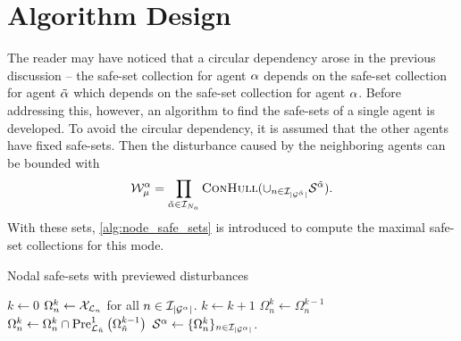 \section{Algorithm Design}
The reader may have noticed that a circular dependency arose in the previous discussion -- the safe-set collection for agent $\alpha$ depends on the safe-set collection for agent ${\tilde{\alpha}}$ which depends on the safe-set collection for agent $\alpha$. Before addressing this, however, an algorithm to find the safe-sets of a single agent is developed. To avoid the circular dependency, it is assumed that the other agents have fixed safe-sets. Then the disturbance caused by the neighboring agents can be bounded with
\begin{equation}
\wcon[\agentidx][\modeidx]=\prod_{\tilde{\agentidx}\in\idxset{\numagents}}\Call{ConHull}{\cup_{n\in\idxset{\gnumnodes[\tilde{\agentidx}]}}\mathcal{S}^{\tilde{\agentidx}}}.
\end{equation}
With these sets, \autoref{alg:node_safe_sets} is introduced to compute the maximal safe-set collections for this mode. 
\begin{algorithm}[h]
\caption{Nodal safe-sets with previewed disturbances}\label{alg:node_safe_sets}
\begin{algorithmic}[1]
\State $k\gets0$
\State $\Omega_{n}^k\gets\xcon[\gnodelabel{n}]$ for all $n\in\idxset{\gnumnodes[\agentidx]}$.
\Repeat 
	\State $k\gets k+1$
		\State $\Omega_{n}^k\gets\Omega_{n}^{k-1}$
				\State $\Omega_{n}^k\gets\Omega_{n}^k\cap\PreviewedPre[\gnodelabel{\tilde{n}}][1]{\Omega_{\tilde{n}}^{k-1}}$
			\EndFor
	\EndFor
{}
\State $\safeset{}^\agentidx\gets\{\Omega_{n}^k\}_{n\in\idxset{\gnumnodes[\agentidx]}}$.\;
\EndProcedure
\end{algorithmic}
\end{algorithm}

